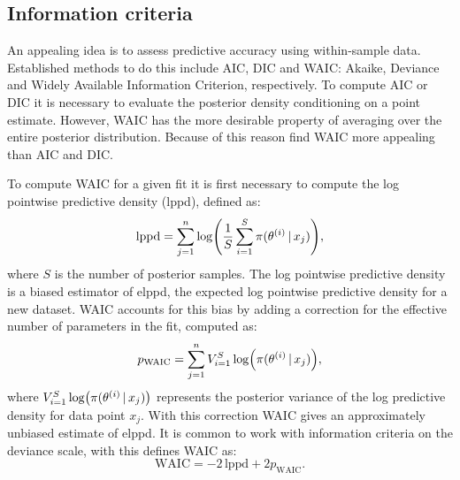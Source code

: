 \subsection{Information criteria}

An appealing idea is to assess predictive accuracy using within-sample data. Established
methods to do this include AIC, DIC and WAIC: Akaike, Deviance and Widely Available
Information Criterion, respectively. To compute AIC or DIC it is necessary to evaluate the
posterior density conditioning on a point estimate. However, WAIC has the more desirable
property of averaging over the entire posterior distribution. Because of this reason
\textcite{gelman13} find WAIC more appealing than AIC and DIC.

To compute WAIC for a given fit it is first necessary to compute the log pointwise
predictive density (lppd), defined as:
\begin{equation*}
  \text{lppd} = \sum_{j=1}^n \log(\frac{1}{S} \sum_{i=1}^S \pi(\theta^{(i)} \,|\, x_j)),
\end{equation*}
where $S$ is the number of posterior samples. The log pointwise predictive density is a
biased estimator of elppd, the expected log pointwise predictive density for a new
dataset.  WAIC accounts for this bias by adding a correction for the effective number of
parameters in the fit, computed as:
\begin{equation*}
    p_{\text{WAIC}} = \sum_{j=1}^n V_{i=1}^{S}\log(\pi(\theta^{(i)} \,|\, x_j)),
\end{equation*}
where $V_{i=1}^{S}\log(\pi(\theta^{(i)} \,|\, x_j))$ represents the posterior variance of
the log predictive density for data point $x_j$. With this correction WAIC gives an
approximately unbiased estimate of elppd. It is common to work with information criteria
on the deviance scale, with this \textcite{watanabe09} defines WAIC as:
\begin{equation*}
    \text{WAIC} = -2\,\text{lppd} +2p_{\text{WAIC}}.
\end{equation*}


